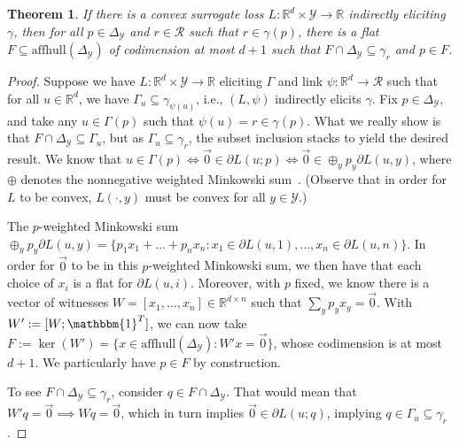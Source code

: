 \documentclass{article}
\newcommand{\Comments}{1}
\newcommand{\mynote}[2]{\ifnum\Comments=1\textcolor{#1}{#2}\fi}
\newcommand{\jessie}[1]{\mynote{purple}{[JF: #1]}}
\newcommand{\reals}{\mathbb{R}}
\newcommand{\simplex}{\Delta_\Y}
\newcommand{\affhull}{\mathrm{affhull}}
\newcommand{\R}{\mathcal{R}}
\newcommand{\Y}{\mathcal{Y}}
\newcommand{\ones}{\mathbbm{1}}
\newtheorem{theorem}{Theorem}
\begin{document}
\begin{theorem}\label{thm:cvx-flats}
%	
	If there is a convex surrogate loss $L : \reals^d \times\Y \to \reals$ indirectly eliciting $\gamma$, then for all $p \in \simplex$ and $r \in \R$ such that $r \in \gamma(p)$, there is a flat $F \subseteq \affhull(\simplex)$ of codimension at most $d+1$ such that $F \cap \simplex \subseteq \gamma_r$ and $p \in F$.
\end{theorem}
\begin{proof}
%	
	Suppose we have $L:\reals^d \times \Y \to \reals$ eliciting $\Gamma$ and link $\psi : \reals^d \to \R$ such that for all $u \in \reals^d$, we have $\Gamma_u \subseteq \gamma_{\psi(u)}$, i.e., $(L, \psi)$ indirectly elicits $\gamma$.
	Fix $p \in \simplex$, and take any $u \in \Gamma(p)$ such that $\psi(u) = r \in \gamma(p)$.
	What we really show is that $F \cap \simplex \subseteq \Gamma_u$, but as $\Gamma_u \subseteq \gamma_r$, the subset inclusion stacks to yield the desired result.
	We know that $u \in \Gamma(p) \iff \vec 0 \in \partial L(u; p) \iff \vec 0 \in \oplus_y p_y \partial L(u,y)$, where $\oplus$ denotes the nonnegative weighted Minkowski sum~\cite[Theorem 4.1.1]{hiriart2012fundamentals}.  (Observe that in order for $L$ to be convex, $L(\cdot, y)$ must be convex for all $y \in \Y$.) 
	
	The $p$-weighted Minkowski sum $\oplus_y p_y \partial L(u,y) = \{p_1 x_1 + \ldots + p_n x_n : x_1 \in \partial L(u,1), \ldots, x_n \in \partial L(u,n) \}$.
	In order for $\vec 0$ to be in this $p$-weighted Minkowski sum, we then have that each choice of $x_i$ is a flat for $\partial L(u, i)$.
	Moreover, with $p$ fixed, we know there is a vector of witnesses $W = [x_1, \ldots, x_n] \in \reals^{d\times n}$ such that $\sum_y p_y x_y = \vec 0$.
	With $W' := [W;\ones^T]$, we can now take $F := \ker(W') = \{x \in \affhull(\simplex) : W' x = \vec 0\}$, whose codimension is at most $d + 1$.
	We particularly have $p \in F$ by construction.

	To see $F \cap \simplex \subseteq \gamma_r$, consider $q \in F \cap \simplex$.
	That would mean that $W'q = \vec 0 \implies Wq = \vec 0$, which in turn implies $\vec 0 \in \partial L(u;q)$, implying $q \in \Gamma_u \subseteq \gamma_{r}$.
\end{proof}
\end{document}
